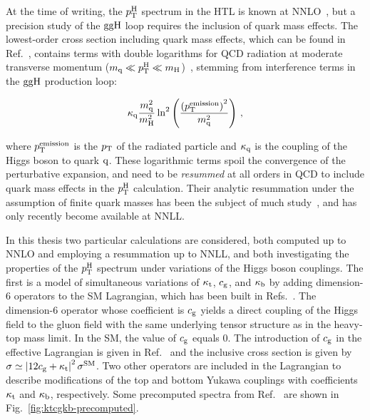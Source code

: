 % 
At the time of writing, the $p_\mathrm{T}^\mathrm{H}$ spectrum in the HTL is known at NNLO~\cite{Boughezal:2015dra,Boughezal:2015aha,Chen:2016zka}, but a precision study of the $\mathrm{g}\mathrm{g}\mathrm{H}$ loop requires the inclusion of quark mass effects.
% 
The lowest-order cross section including quark mass effects, which can be found in Ref.~\cite{Ellis:1987xu}, contains terms with double logarithms for QCD radiation at moderate transverse momentum ($m_{\mathrm{q}} \ll p_\mathrm{T}^\mathrm{H} \ll m_{\mathrm{H}}$)~\cite{Baur:1989cm,Bishara:2016jga}, stemming from interference terms in the $\mathrm{g}\mathrm{g}\mathrm{H}$ production loop:
% 
\begin{linenomath*}
\begin{equation}
\kappa_{\mathrm{q}} \frac{m_{\mathrm{q}}^2}{m_{\mathrm{H}}^2}
    \ln^2 \left(
        \frac{
            \left( p_\mathrm{T}^\text{emission} \right)^2
            }{
            m_\mathrm{q}^2
            }
        \right)
\,,
\end{equation}
\end{linenomath*}
% 
where $p_\mathrm{T}^\text{emission}$ is the $p_\mathrm{T}$ of the radiated particle and $\kappa_{\mathrm{q}}$ is the coupling of the Higgs boson to quark $\mathrm{q}$.
% 
These logarithmic terms spoil the convergence of the perturbative expansion, and need to be \textit{resummed} at all orders in QCD to include quark mass effects in the $p_\mathrm{T}^\mathrm{H}$ calculation.
% 
Their analytic resummation under the assumption of finite quark masses has been the subject of much study~\cite{Bozzi:2003jy,Becher:2010tm,Mantler:2012bj,Grazzini:2013mca,Monni:2016ktx}, and has only recently become available at NNLL.


In this thesis two particular calculations are considered, both computed up to NNLO and employing a resummation up to NNLL, and both investigating the properties of the $p_\mathrm{T}^\mathrm{H}$ spectrum under variations of the Higgs boson couplings.
% 
The first is a model of simultaneous variations of $\kappa_{\mathrm{t}}$, $c_\mathrm{g}$, and $\kappa_{\mathrm{b}}$ by adding dimension-6 operators to the SM Lagrangian, which has been built in Refs.~\cite{Grazzini:2017szg,Grazzini:2016paz}.
% 
The dimension-6 operator whose coefficient is $c_\mathrm{g}$ yields a direct coupling of the Higgs field to the gluon field with the same underlying tensor structure as in the heavy-top mass limit.
% 
In the SM, the value of $c_\mathrm{g}$ equals 0.
% 
The introduction of $c_\mathrm{g}$ in the effective Lagrangian is given in Ref.~\cite{Grazzini:2016paz} and the inclusive cross section is given by $\sigma \simeq \left| 12c_\mathrm{g} + \kappa_{\mathrm{t}} \right|^2 \sigma^\text{SM}$.
% 
Two other operators are included in the Lagrangian to describe modifications of the top and bottom Yukawa couplings with coefficients $\kappa_{\mathrm{t}}$ and $\kappa_{\mathrm{b}}$, respectively.
% 
Some precomputed spectra from Ref.~\cite{Grazzini:2017szg} are shown in Fig.~\ref{fig:ktcgkb-precomputed}.


